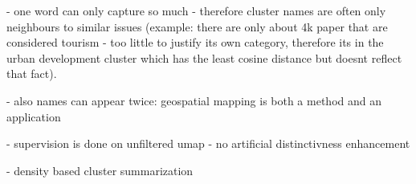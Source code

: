 \documentclass{article}
\begin{document}
- one word can only capture so much - therefore cluster names are often only neighbours to similar issues (example: there are only about 4k paper that are considered tourism - too little to justify its own category, therefore its in the urban development cluster which has the least cosine distance but doesnt reflect that fact). 

- also names can appear twice: geospatial mapping is both a method and an application

- supervision is done on unfiltered umap - no artificial distinctivness enhancement

- density based cluster summarization 

\printbibliography[title={REFERENCES}]
\end{document}
